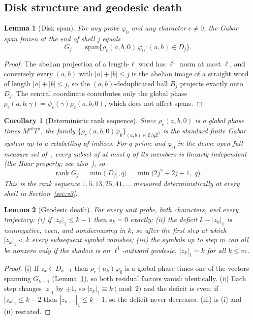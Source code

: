 \documentclass[11pt]{article}
\newtheorem{lemma}{Lemma}
\newtheorem{corollary}{Corollary}
\newcommand{\Zq}{\mathbb{Z}/q\mathbb{Z}}
\begin{document}
\subsection{Disk structure and geodesic death}
\label{sec:disk-death}

\begin{lemma}[Disk span]
\label{lem:disk-span}
For any probe $\varphi_0$ and any character $c\neq0$, the Gabor span frozen at the end of shell $j$ equals
\[
G_j \;=\; \mathrm{span}\{\rho_c(a,b,0)\,\varphi_0 : (a,b)\in D_j\}.
\]
\end{lemma}

\begin{proof}
The abelian projection of a length-$\ell$ word has $\ell^1$ norm at most $\ell$, and conversely every
$(a,b)$ with $|a|+|b|\le j$ is the abelian image of a straight word of length $|a|+|b|\le j$, so the
$(a,b)$-deduplicated ball $B_j$ projects exactly onto $D_j$.
The central coordinate contributes only the global phase $\rho_c(a,b,\gamma)=\psi_c(\gamma)\rho_c(a,b,0)$,
which does not affect spans.
\end{proof}

\begin{corollary}[Deterministic rank sequence]
\label{cor:gabor-rank}
Since $\rho_c(a,b,0)$ is a global phase times $M^{cb}T^{a}$, the family
$\{\rho_c(a,b,0)\varphi_0\}_{(a,b)\in\Zq^2}$ is the standard finite Gabor system up to a relabelling of
indices.
For $q$ prime and $\varphi_0$ in the dense open full-measure set of~\cite{Lawrence2005}, every subset of at
most $q$ of its members is linearly independent (the Haar property; see also~\cite{Malikiosis2015}), so
\[
\operatorname{rank} G_j=\min\bigl(|D_j|,q\bigr)=\min\bigl(2j^2+2j+1,\;q\bigr).
\]
This is the rank sequence $1,5,13,25,41,\dots$ measured deterministically at every shell in
Section~\ref{sec:v3}.
\end{corollary}

\begin{lemma}[Geodesic death]
\label{lem:geodesic-death}
For every unit probe, both characters, and every trajectory:
(i) if $|z_k|_1\le k-1$ then $s_k=0$ exactly;
(ii) the deficit $k-|z_k|_1$ is nonnegative, even, and nondecreasing in $k$, so after the first step at
which $|z_k|_1<k$ every subsequent symbol vanishes;
(iii) the symbols up to step $m$ can all be nonzero only if the shadow is an $\ell^1$-outward geodesic,
$|z_k|_1=k$ for all $k\le m$.
\end{lemma}

\begin{proof}
(i) If $z_k\in D_{k-1}$ then $\rho_c(u_k)\varphi_0$ is a global phase times one of the vectors spanning
$G_{k-1}$ (Lemma~\ref{lem:disk-span}), so both residual factors vanish identically.
(ii) Each step changes $|z|_1$ by $\pm1$, so $|z_k|_1\equiv k \pmod 2$ and the deficit is even; if
$|z_k|_1\le k-2$ then $|z_{k+1}|_1\le k-1$, so the deficit never decreases.
(iii) is (i) and (ii) restated.
\end{proof}
\end{document}
